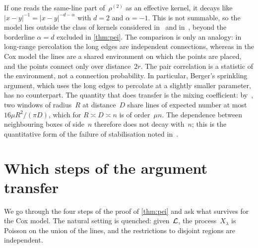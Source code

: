 \documentclass[11pt,letterpaper]{article}
\begin{document}
\begin{remark}
\label{rem:regime}
If one reads the same-line part of~$\rho^{(2)}$ as an effective kernel, it decays like $\lvert x-y\rvert^{-1}=\lvert x-y\rvert^{-d-\alpha}$ with $d=2$ and $\alpha=-1$. This is not summable, so the model lies outside the class of kernels considered in~\cite{Pei26} and in~\cite{Ber02}, beyond the borderline $\alpha=d$ excluded in \cref{thm:pei}. The comparison is only an analogy: in long-range percolation the long edges are independent connections, whereas in the Cox model the lines are a shared environment on which the points are placed, and the points connect only over distance~$2r$. The pair correlation is a statistic of the environment, not a connection probability. In particular, Berger's sprinkling argument, which uses the long edges to percolate at a slightly smaller parameter, has no counterpart. The quantity that does transfer is the mixing coefficient: by~\cite[Lemma~3.2]{HJ26sub}, two windows of radius~$R$ at distance~$D$ share lines of expected number at most $16\mu R^2/(\pi D)$, which for $R\asymp D\asymp n$ is of order~$\mu n$. The dependence between neighbouring boxes of side~$n$ therefore does not decay with~$n$; this is the quantitative form of the failure of stabilisation noted in~\cite[Section~3]{JT22}.
\end{remark}

\section{Which steps of the argument transfer}
\label{sec:transfer}

We go through the four steps of the proof of \cref{thm:pei} and ask what survives for the Cox model. The natural setting is quenched: given~$\mathcal L$, the process~$X_\lambda$ is Poisson on the union of the lines, and the restrictions to disjoint regions are independent.
\end{document}
